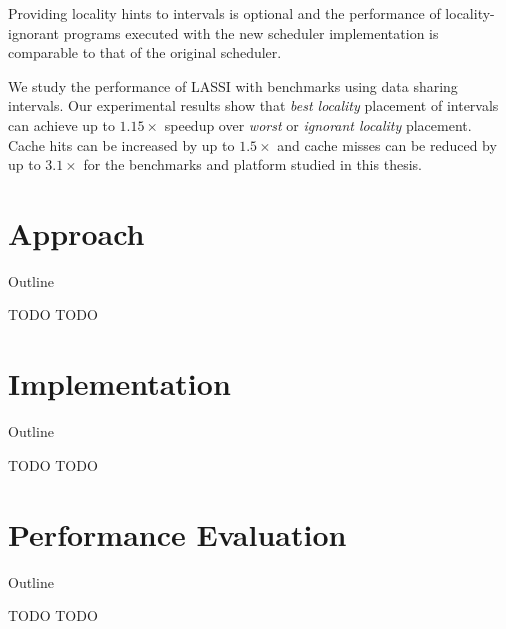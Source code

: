 {  Providing locality hints to intervals is optional and the
  performance of locality-ignorant programs executed with the new
  scheduler implementation is comparable to that of the original
  scheduler.

  We study the performance of LASSI with benchmarks using data sharing
  intervals. Our experimental results show that \emph{best locality}
  placement of intervals can achieve up to $1.15\times$ speedup over
  \emph{worst} or \emph{ignorant locality} placement. Cache hits can
  be increased by up to $1.5\times$ and cache misses can be reduced by
  up to $3.1\times$ for the benchmarks and platform studied in this
  thesis.
}


\section{Approach}

\begin{frame}{Outline}
  \tableofcontents[current]
\end{frame}

\note{
}

\begin{frame}{TODO}
  TODO
\end{frame}

\note{
}


\section{Implementation}

\begin{frame}{Outline}
  \tableofcontents[current]
\end{frame}

\note{
}

\begin{frame}{TODO}
  TODO
\end{frame}

\note{
}


\section{Performance Evaluation}

\begin{frame}{Outline}
  \tableofcontents[current]
\end{frame}

\note{
}

\begin{frame}{TODO}
  TODO
\end{frame}


